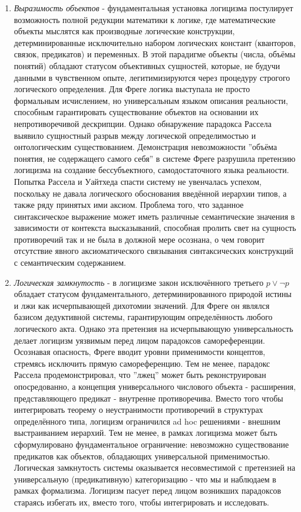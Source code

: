 \documentclass[12pt]{article}
\begin{document}
\begin{enumerate}
    \item {\it Выразимость объектов} - фундаментальная установка логицизма постулирует возможность полной редукции математики к логике, где математические объекты мыслятся как производные логические конструкции, детерминированные исключительно набором логических констант (кванторов, связок, предикатов) и переменных. В этой парадигме объекты (числа, объёмы понятий) обладают статусом объективных сущностей, которые, не будучи данными в чувственном опыте, легитимизируются через процедуру строгого логического определения. Для Фреге логика выступала не просто формальным исчислением, но универсальным языком описания реальности, способным гарантировать существование объектов на основании их непротиворечивой дескрипции. Однако обнаружение парадокса Рассела выявило сущностный разрыв между логической определимостью и онтологическим существованием. Демонстрация невозможности ''объёма понятия, не содержащего самого себя'' в системе Фреге разрушила претензию логицизма на создание бессубъектного, самодостаточного языка реальности. Попытка Рассела и Уайтхеда спасти систему не увенчалась успехом, поскольку не давала логического обоснования введённой иерархии типов, а также ряду принятых ими аксиом. Проблема того, что заданное синтаксическое выражение может иметь различные семантические значения в зависимости от контекста высказываний, способная пролить свет на сущность противоречий так и не была в должной мере осознана, о чем говорит отсутствие явного аксиоматического связывания синтаксических конструкций с семантическим содержанием.
    \item {\it Логическая замкнутость} - в логицизме закон исключённого третьего $p \vee \neg p$ обладает статусом фундаментального, детерминированного природой истины и лжи как исчерпывающей дихотомии значений. Для Фреге он являлся базисом дедуктивной системы, гарантирующим определённость любого логического акта. Однако эта претензия на исчерпывающую универсальность делает логицизм уязвимым перед лицом парадоксов самореференции. Осознавая опасность, Фреге вводит уровни применимости концептов, стремясь исключить прямую самореференцию. Тем не менее, парадокс Рассела продемонстрировал, что ''лжец'' может быть реконструирован опосредованно, а концепция универсального числового объекта - расширения, представляющего предикат - внутренне противоречива. Вместо того чтобы интегрировать теорему о неустранимости противоречий в структурах определённого типа, логицизм ограничился ad hoc решениями - внешним выстраиванием иерархий. Тем не менее, в рамках логицизма может быть сформулировано фундаментальное ограничение: невозможно существование предикатов как объектов, обладающих универсальной применимостью. Логическая замкнутость системы оказывается несовместимой с претензией на универсальную (предикативную) категоризацию - что мы и наблюдаем в рамках формализма. Логицизм пасует перед лицом возникших парадоксов стараясь избегать их, вместо того, чтобы интегрировать и исследовать.

\end{enumerate}
\end{document}
